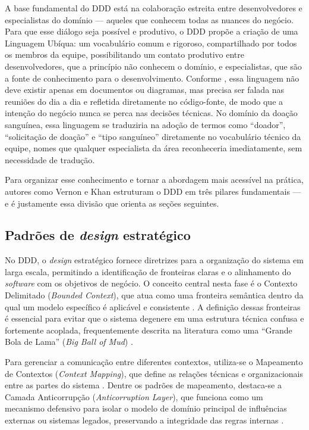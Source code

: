 A base fundamental do DDD está na colaboração estreita entre desenvolvedores e especialistas do domínio --- aqueles que conhecem todas as nuances do negócio. Para que esse diálogo seja possível e produtivo, o DDD propõe a criação de uma Linguagem Ubíqua: um vocabulário comum e rigoroso, compartilhado por todos os membros da equipe, possibilitando um contato produtivo entre desenvolvedores, que a princípio não conhecem o domínio, e especialistas, que são a fonte de conhecimento para o desenvolvimento. Conforme , essa linguagem não deve existir apenas em documentos ou diagramas, mas precisa ser falada nas reuniões do dia a dia e refletida diretamente no código-fonte, de modo que a intenção do negócio nunca se perca nas decisões técnicas. No domínio da doação sanguínea, essa linguagem se traduziria na adoção de termos como ``doador'', ``solicitação de doação'' e ``tipo sanguíneo'' diretamente no vocabulário técnico da equipe, nomes que qualquer especialista da área reconheceria imediatamente, sem necessidade de tradução.

Para organizar esse conhecimento e tornar a abordagem mais acessível na prática, autores como Vernon e Khan estruturam o DDD em três pilares fundamentais --- e é justamente essa divisão que orienta as seções seguintes.

\subsection{Padrões de \textit{design} estratégico}

No DDD, o \textit{design} estratégico fornece diretrizes para a organização do sistema em larga escala, permitindo a identificação de fronteiras claras e o alinhamento do \textit{software} com os objetivos de negócio. O conceito central nesta fase é o Contexto Delimitado (\textit{Bounded Context}), que atua como uma fronteira semântica dentro da qual um modelo específico é aplicável e consistente \cite{evans2003}. A definição dessas fronteiras é essencial para evitar que o sistema degenere em uma estrutura técnica confusa e fortemente acoplada, frequentemente descrita na literatura como uma ``Grande Bola de Lama'' (\textit{Big Ball of Mud}) \cite{vernon2013}.

Para gerenciar a comunicação entre diferentes contextos, utiliza-se o Mapeamento de Contextos (\textit{Context Mapping}), que define as relações técnicas e organizacionais entre as partes do sistema \cite{vernon2016}. Dentre os padrões de mapeamento, destaca-se a Camada Anticorrupção (\textit{Anticorruption Layer}), que funciona como um mecanismo defensivo para isolar o modelo de domínio principal de influências externas ou sistemas legados, preservando a integridade das regras internas \cite{evans2003}.

